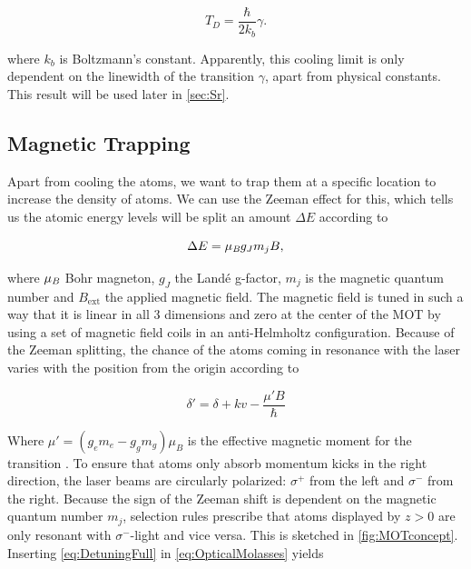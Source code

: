 \begin{equation}\label{eq:DopplerTemperature}
	T_D = \frac{\hbar}{2k_b} \gamma.
\end{equation}

where $k_b$ is Boltzmann's constant. Apparently, this cooling limit is only dependent on the linewidth of the transition $\gamma$, apart from physical constants. This result will be used later in \cref{sec:Sr}.

\subsection{Magnetic Trapping}

Apart from cooling the atoms, we want to trap them at a specific location to increase the density of atoms. We can use the Zeeman effect for this, which tells us the atomic energy levels will be split an amount $\Delta E$ according to \cite{Griffiths2004}

\begin{equation}\label{eq:Zeeman}
	\Delta E = \mu_{\emph{B}} g_J m_j B,
\end{equation}

where $\mu_{\emph{B}}$ Bohr magneton, $g_J$ the Landé g-factor, $m_j$ is the magnetic quantum number and $B_{\text{ext}}$ the applied magnetic field. The magnetic field is tuned in such a way that it is linear in all 3 dimensions and zero at the center of the \ac{MOT} by using a set of magnetic field coils in an anti-Helmholtz configuration. Because of the Zeeman splitting, the chance of the atoms coming in resonance with the laser varies with the position from the origin according to \cite{Kowalski2010}

\begin{equation}\label{eq:DetuningFull}
	\delta' = \delta + k v - \frac{\mu'B}{\hbar}
\end{equation}

Where $\mu' = (g_e m_e-g_g m_g)\mu_B$ is the effective magnetic moment for the transition \cite{Kowalski2010}. To ensure that atoms only absorb momentum kicks in the right direction, the laser beams are circularly polarized: $\sigma^+$ from the left and $\sigma^-$ from the right. Because the sign of the Zeeman shift is dependent on the magnetic quantum number $m_j$, selection rules prescribe that atoms displayed by $z>0$ are only resonant with $\sigma^-$-light and vice versa. This is sketched in \cref{fig:MOTconcept}. Inserting \cref{eq:DetuningFull} in \cref{eq:OpticalMolasses} yields

